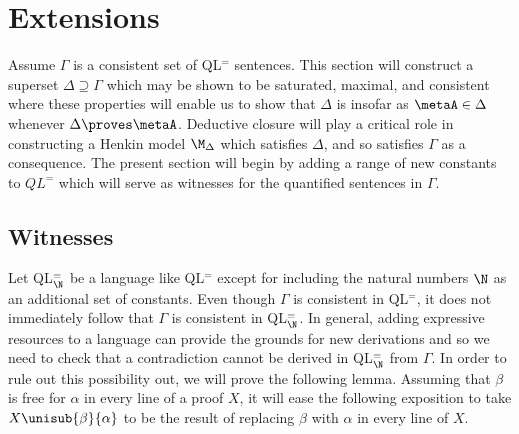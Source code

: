 \section{Extensions}%
  \label{sec:Extensions}

Assume $\Gamma$ is a consistent set of QL$^=$ sentences.
This section will construct a superset $\Delta\supseteq\Gamma$ which may be shown to be saturated, maximal, and consistent where these properties will enable us to show that $\Delta$ is  insofar as $\metaA\in\Delta$ whenever $\Delta\proves\metaA$. 
Deductive closure will play a critical role in constructing a Henkin model $\M_\Delta$ which satisfies $\Delta$, and so satisfies $\Gamma$ as a consequence. 
The present section will begin by adding a range of new constants to $QL^=$ which will serve as witnesses for the quantified sentences in $\Gamma$.





\subsection{Witnesses}%
  \label{sub:Witnesses}
  

Let QL$^=_{\N}$ be a language like QL$^=$ except for including the natural numbers $\N$ as an additional set of constants.
Even though $\Gamma$ is consistent in QL$^=$, it does not immediately follow that $\Gamma$ is consistent in QL$^=_{\N}$.
In general, adding expressive resources to a language can provide the grounds for new derivations and so we need to check that a contradiction cannot be derived in QL$^=_{\N}$ from $\Gamma$.
In order to rule out this possibility out, we will prove the following lemma.
Assuming that $\beta$ is free for $\alpha$ in every line of a proof $X$, it will ease the following exposition to take $X\unisub{\beta}{\alpha}$ to be the result of replacing $\beta$ with $\alpha$ in every line of $X$.

%

